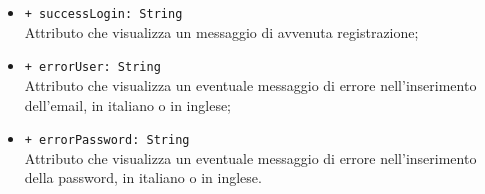\begin{itemize}
\begin{itemize}
		\item \texttt{+ successLogin: String} \\ Attributo che visualizza un messaggio di avvenuta registrazione;
		\item \texttt{+ errorUser: String} \\ Attributo che visualizza un eventuale messaggio di errore nell'inserimento dell'email, in italiano o in inglese;
		\item \texttt{+ errorPassword: String} \\ Attributo che visualizza un eventuale messaggio di errore nell'inserimento della password, in italiano o in inglese.
	\end{itemize}
\end{itemize}